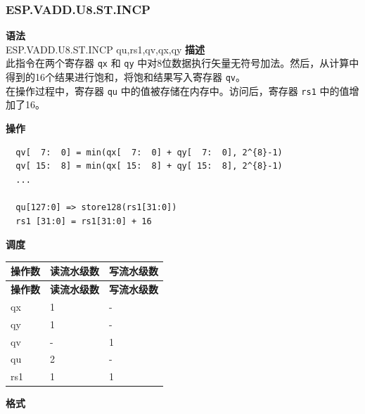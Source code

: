 \newpage
\subsubsection{ESP.VADD.U8.ST.INCP}\label{instruction:ESPVADDU8STINCP}
\textbf{语法}\\
ESP.VADD.U8.ST.INCP qu,rs1,qv,qx,qy
\textbf{描述}\\
此指令在两个寄存器 \lstinline{qx} 和 \lstinline{qy} 中对8位数据执行矢量无符号加法。然后，从计算中得到的16个结果进行饱和，将饱和结果写入寄存器 \lstinline{qv}。\\ 在操作过程中，寄存器 \lstinline{qu} 中的值被存储在内存中。访问后，寄存器 \lstinline{rs1} 中的值增加了16。

\textbf{操作}\\
\begin{lstlisting}
  qv[  7:  0] = min(qx[  7:  0] + qy[  7:  0], 2^{8}-1)
  qv[ 15:  8] = min(qx[ 15:  8] + qy[ 15:  8], 2^{8}-1)
  ...

  qu[127:0] => store128(rs1[31:0])
  rs1 [31:0] = rs1[31:0] + 16
\end{lstlisting}

\textbf{调度}\\
\begin{longtable}[c]{|l|l|l|}
    \hline
    \rowcolor{lightgray}
    \textbf{操作数} & \textbf{读流水级数} & \textbf{写流水级数} \\\hline
    \endfirsthead
    \hline
    \rowcolor{lightgray}
     \textbf{操作数} & \textbf{读流水级数} & \textbf{写流水级数} \\\hline
    \endhead
    \hline
    \endfoot

    qx & 1 & - \\\hline
  qy & 1 & - \\\hline
     qv & - & 1 \\\hline
     qu & 2 & - \\\hline
     rs1 & 1 & 1

\end{longtable}

\textbf{格式}\\

